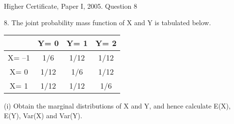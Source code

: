 \documentclass[a4paper,12pt]{article}
\begin{document}
Higher Certificate, Paper I, 2005. Question 8

\begin{framed}
8. The joint probability mass function of X and Y is tabulated below.
\begin{center}
\begin{tabular}{|c|c|c|c|}\hline 
   & Y= 0    & Y= 1    & Y= 2        \\ \hline \hline 
X= –1 & 1/6  & 1/12 & 1/12  \\ \hline 
X=  0 & 1/12 & 1/6  & 1/12  \\ \hline 
X=  1 & 1/12 & 1/12 & 1/6  \\ \hline 

\end{tabular}
\end{center}
(i) Obtain the marginal distributions of X and Y, and hence calculate E(X), E(Y),
Var(X) and Var(Y).
\end{framed}


\end{document}
